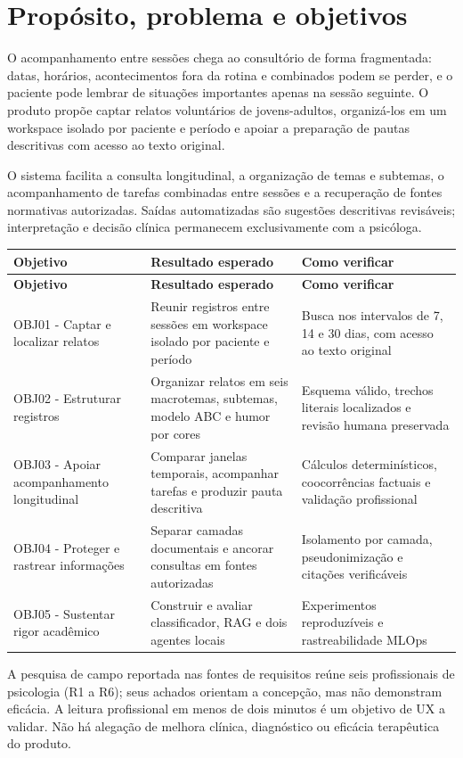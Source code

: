 \documentclass[11pt,a4paper]{article}
\begin{document}
\section{Propósito, problema e objetivos}
O acompanhamento entre sessões chega ao consultório de forma fragmentada: datas, horários, acontecimentos fora da rotina e combinados podem se perder, e o paciente pode lembrar de situações importantes apenas na sessão seguinte. O produto propõe captar relatos voluntários de jovens-adultos, organizá-los em um workspace isolado por paciente e período e apoiar a preparação de pautas descritivas com acesso ao texto original.

O sistema facilita a consulta longitudinal, a organização de temas e subtemas, o acompanhamento de tarefas combinadas entre sessões e a recuperação de fontes normativas autorizadas. Saídas automatizadas são sugestões descritivas revisáveis; interpretação e decisão clínica permanecem exclusivamente com a psicóloga.

\begingroup\small
\begin{longtable}{>{\raggedright\arraybackslash}p{}>{\raggedright\arraybackslash}p{}>{\raggedright\arraybackslash}p{}}
\toprule
\textbf{Objetivo} & \textbf{Resultado esperado} & \textbf{Como verificar} \\ \midrule\endfirsthead
\toprule
\textbf{Objetivo} & \textbf{Resultado esperado} & \textbf{Como verificar} \\ \midrule\endhead
\bottomrule\endfoot
OBJ01 - Captar e localizar relatos & Reunir registros entre sessões em workspace isolado por paciente e período & Busca nos intervalos de 7, 14 e 30 dias, com acesso ao texto original \\[3pt]
OBJ02 - Estruturar registros & Organizar relatos em seis macrotemas, subtemas, modelo ABC e humor por cores & Esquema válido, trechos literais localizados e revisão humana preservada \\[3pt]
OBJ03 - Apoiar acompanhamento longitudinal & Comparar janelas temporais, acompanhar tarefas e produzir pauta descritiva & Cálculos determinísticos, coocorrências factuais e validação profissional \\[3pt]
OBJ04 - Proteger e rastrear informações & Separar camadas documentais e ancorar consultas em fontes autorizadas & Isolamento por camada, pseudonimização e citações verificáveis \\[3pt]
OBJ05 - Sustentar rigor acadêmico & Construir e avaliar classificador, RAG e dois agentes locais & Experimentos reproduzíveis e rastreabilidade MLOps \\[3pt]
\end{longtable}
\endgroup
A pesquisa de campo reportada nas fontes de requisitos reúne seis profissionais de psicologia (R1 a R6); seus achados orientam a concepção, mas não demonstram eficácia. A leitura profissional em menos de dois minutos é um objetivo de UX a validar. Não há alegação de melhora clínica, diagnóstico ou eficácia terapêutica do produto.
\end{document}
